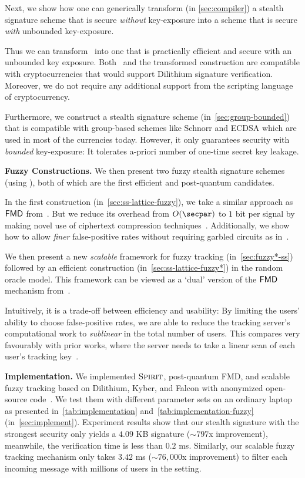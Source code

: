 Next, we show how one can generically transform (in \cref{sec:compiler}) a stealth signature scheme that is secure \emph{without} key-exposure into a scheme that is secure \emph{with} unbounded key-exposure.

Thus we can transform \name\ into one that is practically efficient and secure with an unbounded key exposure. Both \name\ and the transformed construction are compatible with cryptocurrencies that would support Dilithium signature verification. Moreover, we do not require any additional support from the scripting language of cryptocurrency.


Furthermore, we construct a stealth signature scheme (in~\cref{sec:group-bounded}) that is compatible with group-based schemes like Schnorr and ECDSA which are used in most of the currencies today. 
However, it only guarantees security with \emph{bounded} key-exposure: It tolerates a-priori number of one-time secret key leakage.


\smallskip\noindent\textbf{Fuzzy Constructions.} We then present two fuzzy stealth signature schemes (using \name), both of which are the first efficient and post-quantum candidates.

In the first construction (in~\cref{sec:ss-lattice-fuzzy}), we take a similar approach as $\mathsf{FMD}$ from~\cite{CCS:BLMG21}. 
But we reduce its overhead from $O(\secpar)$ to $1$ bit per signal by making novel use of ciphertext compression techniques~\cite{TCC:BDGM19}. 
Additionally, we show how to allow \emph{finer} false-positive rates without requiring garbled circuits as in~\cite{CCS:BLMG21}.


We then present a new \emph{scalable} framework for fuzzy tracking (in~\cref{sec:fuzzy*-ss}) followed by an efficient construction (in~\cref{sec:ss-lattice-fuzzy*}) in the random oracle model.
This framework can be viewed as a `dual' version of the $\mathsf{FMD}$ mechanism from~\cite{CCS:BLMG21}. 

Intuitively, it is a trade-off between efficiency and usability: By limiting the users' ability to choose false-positive rates, we are able to reduce the tracking server's computational work to \emph{sublinear} in the total number of users. This compares very favourably with prior works, where the server needs to take a linear scan of each user's tracking key~\cite{CCS:BLMG21,USENIX:MSSSV22,C:LiuTro22}. 

\smallskip\noindent\textbf{Implementation.}
We implemented $\textsc{Spirit}$, post-quantum FMD, and scalable fuzzy tracking based on Dilithium, Kyber, and Falcon with anonymized open-source code~\cite{implementation}. We test them with different parameter sets on an ordinary laptop as presented  in~\cref{tab:implementation} and~\cref{tab:implementation-fuzzy} (in~\cref{sec:implement}). Experiment results show that our stealth signature with the strongest security only yields a $4.09$ KB signature ($\sim 797$x improvement), meanwhile, the verification time is less than $0.2$ ms. Similarly, our scalable fuzzy tracking mechanism only takes $3.42$ ms ($\sim 76,000$x improvement) to filter each incoming message with millions of users in the setting.


